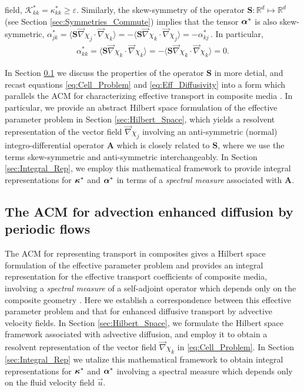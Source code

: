 \documentclass[11pt]{amsart}
\newcommand{\Sb}{\mathbf{S}}
\newcommand{\Ab}{\mathbf{A}}
\newcommand{\Kc}{\mathcal{K}}
\newcommand\balpha{\mbox{\boldmath${\alpha}$}}
\newcommand\bkappa{\mbox{\boldmath${\kappa}$}}
\begin{document}
field, $\Kc^*_{kk}=\kappa^*_{kk}\geq\varepsilon$. Similarly, the skew-symmetry of the
operator $\Sb:\mathbb{R}^d\mapsto\mathbb{R}^d$ (see Section
\ref{sec:Symmetries_Commute}) implies that the tensor $\balpha^*$ is also
skew-symmetric,
$\alpha^*_{jk}=\langle\Sb\vec{\nabla}\chi_j\cdot\vec{\nabla}\chi_k\rangle=-\langle\Sb\vec{\nabla}\chi_k\cdot\vec{\nabla}\chi_j\rangle=-\alpha^*_{kj}\,$. In
particular,    
%
\begin{align}\label{eq:Sb_Skew}
  \alpha^*_{kk}=\langle\Sb\vec{\nabla}\chi_k\cdot\vec{\nabla}\chi_k\rangle=-\langle\Sb\vec{\nabla}\chi_k\cdot\vec{\nabla}\chi_k\rangle=0.  
\end{align}
%
  




In Section \ref{sec:ACM} we discuss the properties of the operator
$\Sb$ in more detial, and recast equations \eqref{eq:Cell_Problem}
and \eqref{eq:Eff_Diffusivity} into a form which parallels the ACM for
characterizing effective transport in composite media
\cite{Golden:CMP-473}. In particular, we provide an abstract Hilbert
space formulation of the effective parameter problem in Section
\ref{sec:Hilbert_Space}, which yields a resolvent representation of the
vector field $\vec{\nabla}\chi_j$ involving an anti-symmetric (normal)
integro-differential operator $\Ab$ which is closely related to
$\Sb$, where we use the terms skew-symmetric and anti-symmetric
interchangeably. In Section  \ref{sec:Integral_Rep}, we employ this
mathematical framework to provide integral representations for
$\bkappa^*$ and $\balpha^*$ in terms of a \emph{spectral measure}
associated with $\Ab$.    







\subsection{The ACM for advection enhanced diffusion by periodic
  flows} \label{sec:ACM}   
%
The ACM for representing transport in composites gives a Hilbert space
formulation of the effective parameter problem and provides an
integral representation for the effective transport coefficients of
composite media, involving a \emph{spectral measure} of a self-adjoint
operator which depends only on the composite geometry
\cite{Golden:CMP-473,Murphy:JMP:063506,MILTON:2002:TC}. Here 
we establish a correspondence between this effective parameter problem
and that for enhanced diffusive transport by advective velocity
fields. In Section \ref{sec:Hilbert_Space}, we formulate the Hilbert
space framework associated with advective diffusion, and employ it to
obtain a resolvent representation of the vector field $\vec{\nabla}\chi_k$ in
\eqref{eq:Cell_Problem}. In Section \ref{sec:Integral_Rep} we utalize
this mathematical framework to obtain integral representations for 
$\bkappa^*$ and $\balpha^*$ involving a spectral measure which depends
only on the fluid velocity field $\vec{u}$.    
\end{document}
